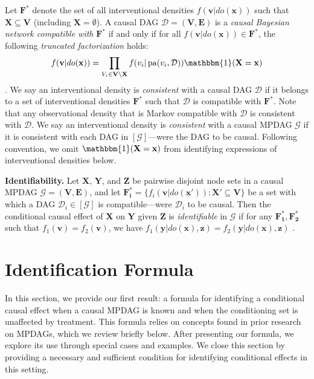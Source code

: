 \documentclass[11pt]{article}
\DeclareMathOperator{\pa}{pa}
\newcommand{\mb}[1]{\mathbf{#1}}
\newcommand{\g}[1][G]{\mathcal{#1}}
\begin{document}
Let $\mb{F^*}$ denote the set of all interventional densities $f(\mb{v}|do(\mb{x}))$ such that $\mb{X} \subseteq \mb{V}$ (including $\mb{X} = \emptyset$). A causal DAG $\g[D] = (\mb{V,E})$ is a \textit{causal Bayesian network compatible with} $\mb{F^*}$ if and only if for all $f(\mb{v} | do(\mb{x})) \in \mb{F^*}$, the following \textit{truncated factorization} holds:
\begin{align}
    f(\mb{v} | do(\mb{x})) = \prod_{V_i \in \mb{V} \setminus \mb{X}} f(v_i|\pa(v_i,\g[D])) \mathbbm{1}(\mb{X} = \mb{x}) \label{eq:trunc-fact}
\end{align}
\citep{pearl2009causality, bareinboim2012local}. We say an interventional density is \textit{consistent} with a causal DAG $\g[D]$ if it belongs to a set of interventional densities $\mb{F^*}$ such that $\g[D]$ is compatible with $\mb{F^*}$. Note that any observational density that is Markov compatible with $\g[D]$ is consistent with $\g[D]$. We say an interventional density is \textit{consistent} with a causal MPDAG $\g$ if it is consistent with each DAG in $[\g]$---were the DAG to be causal. Following convention, we omit $\mathbbm{1}(\mb{X} = \mb{x})$ from identifying expressions of interventional densities below.

\textbf{Identifiability.}
Let $\mb{X}$, $\mb{Y}$, and $\mb{Z}$ be pairwise disjoint node sets in a causal MPDAG $\g = (\mb{V,E})$, and let $\mb{F^*_i} = \{ f_i(\mb{v}|do(\mb{x'})) : \mb{X'} \subseteq \mb{V} \}$ be a set with which a DAG $\g[D]_i \in [\g]$ is compatible---were $\g[D]_i$ to be causal. Then the conditional causal effect of $\mb{X}$ on $\mb{Y}$ given $\mb{Z}$ is \textit{identifiable} in $\g$ if for any $\mb{F^*_1}, \mb{F^*_2}$ such that $f_1(\mb{v}) = f_2(\mb{v})$, we have $f_1(\mb{y}|do(\mb{x}), \mb{z}) = f_2(\mb{y}|do(\mb{x}), \mb{z})$ \citep{pearl2009causality}.











\section{Identification Formula}
\label{sec:id}

In this section, we provide our first result: a formula for identifying a conditional causal effect when a causal MPDAG is known and when the conditioning set is unaffected by treatment. This formula relies on concepts found in prior research on MPDAGs, which we review briefly below. After presenting our formula, we explore its use through special cases and examples. We close this section by providing a necessary and sufficient condition for identifying conditional effects in this setting.
\end{document}
